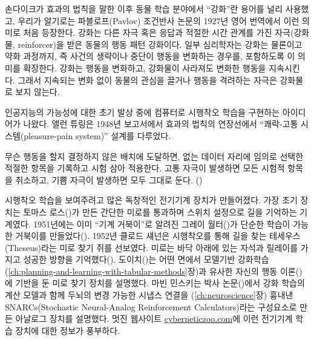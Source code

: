 손다이크가 효과의 법칙을 말한 이후 동물 학습 분야에서 ``강화''란 용어를 널리
사용했고, 우리가 알기로는 파블로프(Pavlov) 조건반사 논문의 1927년 영어 번역에서
이런 의미로 처음 등장한다.  강화는 다른 자극 혹은 응답과 적절한 시간 관계를 가진
자극(강화물, reinforcer)을 받은 동물의 행동 패턴 강화이다. 일부 심리학자는
강화는 물론이고 약화 과정까지, 즉 사건의 생략이나 중단이 행동을 변화하는 경우를,
포함하도록 이 의미를 확장한다. 강화는 행동을 변화하고, 강화물이 사라져도 변화한
행동을 지속시킨다. 그래서 지속되는 변화 없이 동물의 관심을 끌거나 행동을
격려하는 자극은 강화물로 보지 않는다.

인공지능의 가능성에 대한 초기 발상 중에 컴퓨터로 시행착오 학습을 구현하는
아이디어가 나왔다. 앨런 튜링은 1948년 보고서에서 효과의 법칙의 연장선에서
``쾌락-고통 시스템(pleasure-pain system)'' 설계를 다루었다.

\begin{displayquote}
무슨 행동을 할지 결정하지 않은 배치에 도달하면, 없는 데이터 자리에 임의로 선택한
적절한 항목을 기록하고 시험 삼아 적용한다. 고통 자극이 발생하면 모든 시험적
항목을 취소하고, 기쁨 자극이 발생하면 모두 그대로 둔다. (\cite{Turing1948})
\end{displayquote}

시행착오 학습을 보여주려고 많은 독창적인 전기기계 장치가 만들어졌다. 가장 초기
장치는 토마스 로스(\cite{Ross1933})가 만든 간단한 미로를 통과하며 스위치
설정으로 길을 기억하는 기계였다. 1951년에는 이미 ``기계 거북이''로 알려진 그레이
월터(\cite{Walter1950})가 단순한 학습이 가능한 거북이를
만들었다(\cite{Walter1951}). 1952년 클로드 섀넌은 시행착오를 통해 길을 찾는
테세우스(Theseus)라는 미로 찾기 쥐를 선보였다. 미로는 바닥 아래에 있는 자석과
릴레이를 가지고 성공한 방향을 기억했다(\cite{Shannon1951, Shannon1952}).
도이치(\cite{Deutsch1954})는 어떤 면에서 모델기반
강화학습(\ref{ch:planning-and-learning-with-tabular-methods}장)과 유사한 자신의
행동 이론(\cite{Deutsch1953})에 기반을 둔 미로 찾기 장치를 설명했다. 마빈
민스키는 박사 논문(\cite{Minsky1954})에서 강화 학습의 계산 모델과 함께 두뇌의
변경 가능한 시냅스 연결을 (\ref{ch:neuroscience}장) 흉내낸 SNARCs(Stochastic
Neural-Analog Reinforcement Calculators)라는 구성요소로 만든 아날로그 장치를
설명했다. 멋진 웹사이트 \url{cyberneticzoo.com}에 이런 전기기계 학습 장치에
대한 정보가 풍부하다.


